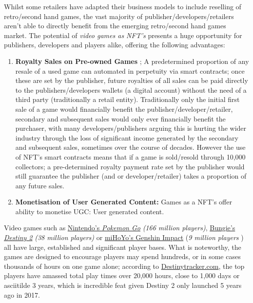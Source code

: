 Whilst some retailers have adapted their business models to include
reselling of retro/second hand games, the vast majority of
publisher/developers/retailers aren't able to directly benefit from the
emerging retro/second hand games market. The potential of \emph{video
games as NFT's} presents a huge opportunity for publishers, developers
and players alike, offering the following advantages:

\begin{enumerate}
\def\labelenumi{\alph{enumi}.}
\item
  \textbf{Royalty Sales on Pre-owned Games} ; A predetermined proportion
  of any resale of a used game can automated in perpetuity via smart
  contracts; once these are set by the publisher, future royalties of
  all sales can be paid directly to the publishers/developers wallets (a
  digital account) without the need of a third party (traditionally a
  retail entity). Traditionally only the initial first sale of a game
  would financially benefit the publisher/developer/retailer, secondary
  and subsequent sales would only ever financially benefit the
  purchaser, with many developers/publishers arguing this is hurting the
  wider industry through the loss of significant income generated by the
  secondary and subsequent sales, sometimes over the course of decades.
  However the use of NFT's smart contracts means that if a game is
  sold/resold through 10,000 collectors; a pre-determined royalty
  payment rate set by the publisher would still guarantee the publisher
  (and or developer/retailer) takes a proportion of any future sales.
\item
  \textbf{Monetisation of User Generated Content:} Games as a NFT's
  offer ability to monetise UGC: User generated content.
\end{enumerate}

Video games such as
\href{https://www.businessofapps.com/data/pokemon-go-statistics/}{Nintendo's
\emph{Pokemon Go}} \emph{(166 million players)},
\href{https://techacake.com/destiny-2-player-count/\#:~:text=The\%20total\%20player\%20base\%20of,to\%20be\%2038\%20million\%20players.\&text=According\%20to\%20the\%20source\%2C\%20the,in\%20terms\%20of\%20player\%20population.}{Bungie's
\emph{Destiny 2}} \emph{(38 million players)} or
\href{https://fictionhorizon.com/how-many-people-play-genshin-impact/\#:~:text=Genshin\%20Impact\%20had\%20approximately\%209,million\%20users\%20in\%20June\%202021.}{miHoYo's
Genshin Impact} (\emph{9 million players} ) all have large, established
and significant player bases. What is noteworthy, the games are designed
to encourage players may spend hundreds, or in some cases thousands of
hours on one game alone; according to
\href{https://destinytracker.com/destiny/leaderboards/all/minutesplayedtotal?grouped=true\&page=1}{Destinytracker.com},
the top players have amassed total play times over 20,000 hours, close
to 1,000 days or asciitilde{} 3 years, which is incredible feat
given Destiny 2 only launched 5 years ago in 2017.

